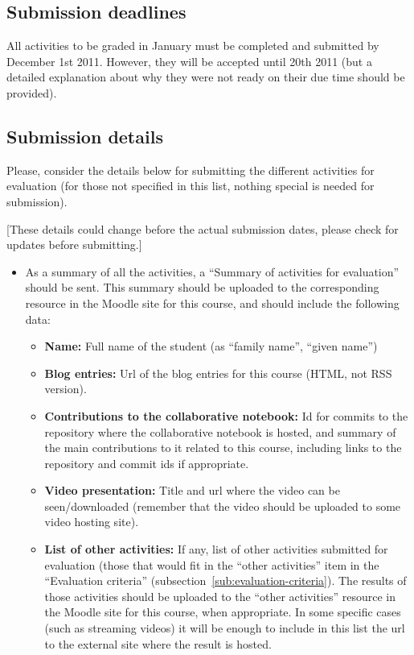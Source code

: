 \documentclass[a4paper]{article}
\begin{document}
\subsection{Submission deadlines}

All activities to be graded in January must be completed and submitted by December 1st 2011. However, they will be accepted until 20th 2011 (but a detailed explanation about why they were not ready on their due time should be provided).

\subsection{Submission details}

Please, consider the details below for submitting the different activities for evaluation (for those not specified in this list, nothing special is needed for submission).

[These details could change before the actual submission dates, please check for updates before submitting.]

\begin{itemize}
\item As a summary of all the activities, a ``Summary of activities for evaluation'' should be sent. This summary should be uploaded to the corresponding resource in the Moodle site for this course, and should include the following data:
  \begin{itemize}
  \item \textbf{Name:} Full name of the student (as ``family name'', ``given name'')
  \item \textbf{Blog entries:} Url of the blog entries for this course (HTML, not RSS version).
  \item \textbf{Contributions to the collaborative notebook:} Id for commits to the repository where the collaborative notebook is hosted, and summary of the main contributions to it related to this course, including links to the repository and commit ids if appropriate.
  \item \textbf{Video presentation:} Title and url where the video can be seen/downloaded (remember that the video should be uploaded to some video hosting site).
  \item \textbf{List of other activities:} If any, list of other activities submitted for evaluation (those that would fit in the ``other activities'' item in the ``Evaluation criteria'' (subsection~\ref{sub:evaluation-criteria}). The results of those activities should be uploaded to the ``other activities'' resource in the Moodle site for this course, when appropriate. In some specific cases (such as streaming videos) it will be enough to include in this list the url to the external site where the result is hosted.
  \end{itemize}
\end{itemize}
\end{document}
